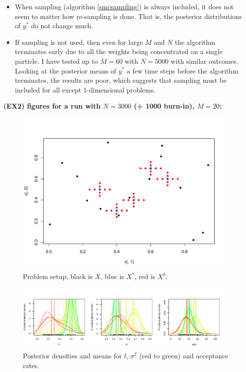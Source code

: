 \documentclass{sfuthesis}
\begin{document}
\begin{itemize}
  \item When sampling (algorithm \ref{smcsampling}) is always included, it does not seem to matter how re-sampling is done. That is, the posterior distributions of $y^*$ do not change much.
  \item If sampling is not used, then even for large $M$ and $N$ the algorithm terminates early due to all the weights being concentrated on a single particle. I have tested up to $M = 60$ with $N = 5000$ with similar outcomes. Looking at the posterior means of $y^*$ a few time steps before the algorithm terminates, the results are poor, which suggests that sampling must be included for all except 1-dimensional problems. 

\end{itemize}

\textbf{(EX2) figures for a run with $N = 3000$ (+ 1000 burn-in), $M = 20$:}

\begin{figure}[H]
  \begin{center}
    \includegraphics[width=0.98\textwidth]{ex2given.pdf}
    \vspace{0.1mm}
    \caption{Problem setup; black is $X$, blue is $X^*$, red is $X^\delta$.}
    \label{ex2given}
  \end{center}
\end{figure}

\begin{figure}[H]
  \begin{center}
    \includegraphics[width=0.98\textwidth]{ex2paras.pdf}
    \vspace{0.1mm}
    \caption{Posterior densities and means for $l$, $\sigma^2$ (red to green) and acceptance rates.}
    \label{ex2paras}
  \end{center}
\end{figure}
\end{document}
